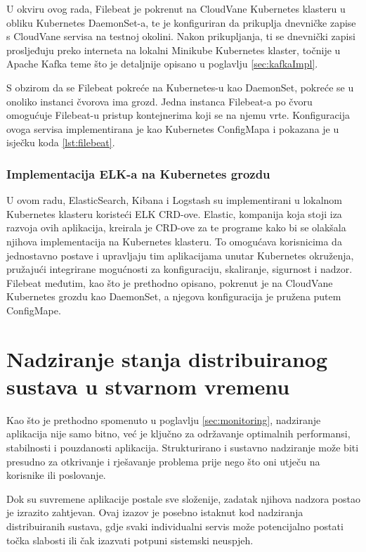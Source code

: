 \documentclass[times, utf8, diplomski]{fer}
\begin{document}
U okviru ovog rada, Filebeat je pokrenut na CloudVane Kubernetes klasteru u obliku Kubernetes DaemonSet-a, te je konfiguriran da prikuplja dnevničke zapise s CloudVane servisa na testnoj okolini. Nakon prikupljanja, ti se dnevnički zapisi prosljeđuju preko interneta na lokalni Minikube Kubernetes klaster, točnije u Apache Kafka teme što je detaljnije opisano u poglavlju \ref{sec:kafkaImpl}. 

S obzirom da se Filebeat pokreće na Kubernetes-u kao DaemonSet, pokreće se u onoliko instanci čvorova ima grozd. Jedna instanca Filebeat-a po čvoru omogućuje Filebeat-u pristup kontejnerima koji se na njemu vrte. Konfiguracija ovoga servisa implementirana je kao Kubernetes ConfigMapa i pokazana je u isječku koda \ref{lst:filebeat}.

\subsection{Implementacija ELK-a na Kubernetes grozdu}
\label{sec:elk_impl}

U ovom radu, ElasticSearch, Kibana i Logstash su implementirani u lokalnom Kubernetes klasteru koristeći ELK CRD-ove. Elastic, kompanija koja stoji iza razvoja ovih aplikacija, kreirala je CRD-ove za te programe kako bi se olakšala njihova implementacija na Kubernetes klasteru. To omogućava korisnicima da jednostavno postave i upravljaju tim aplikacijama unutar Kubernetes okruženja, pružajući integrirane mogućnosti za konfiguraciju, skaliranje, sigurnost i nadzor.\\

Filebeat međutim, kao što je prethodno opisano, pokrenut je na CloudVane Kubernetes grozdu kao DaemonSet, a njegova konfiguracija je pružena putem ConfigMape.

\chapter{Nadziranje stanja distribuiranog sustava u stvarnom vremenu}
\label{sec:streamingMonitoring}

Kao što je prethodno spomenuto u poglavlju \ref{sec:monitoring}, nadziranje aplikacija nije samo bitno, već je ključno za održavanje optimalnih performansi, stabilnosti i pouzdanosti aplikacija. Strukturirano i sustavno nadziranje može biti presudno za otkrivanje i rješavanje problema prije nego što oni utječu na korisnike ili poslovanje.

Dok su suvremene aplikacije postale sve složenije, zadatak njihova nadzora postao je izrazito zahtjevan. Ovaj izazov je posebno istaknut kod nadziranja distribuiranih sustava, gdje svaki individualni servis može potencijalno postati točka slabosti ili čak izazvati potpuni sistemski neuspjeh.
\end{document}
